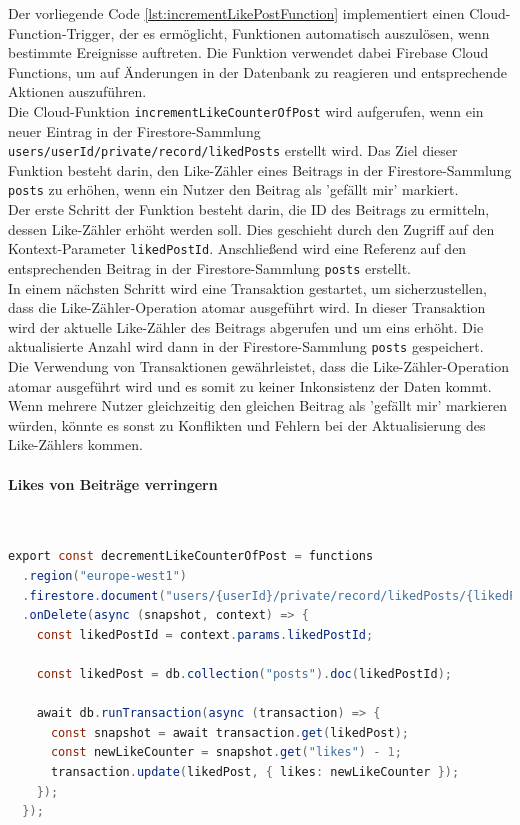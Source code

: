 Der vorliegende Code \ref{lst:incrementLikePostFunction} implementiert einen Cloud-Function-Trigger, der es ermöglicht, Funktionen automatisch auszulösen, wenn bestimmte Ereignisse auftreten. Die Funktion verwendet dabei Firebase Cloud Functions, um auf Änderungen in der Datenbank zu reagieren und entsprechende Aktionen auszuführen.
\\
Die Cloud-Funktion \texttt{incrementLikeCounterOfPost} wird aufgerufen, wenn ein neuer Eintrag in der Firestore-Sammlung \texttt{users/{userId}/private/record/likedPosts} erstellt wird. Das Ziel dieser Funktion besteht darin, den Like-Zähler eines Beitrags in der Firestore-Sammlung \texttt{posts} zu erhöhen, wenn ein Nutzer den Beitrag als 'gefällt mir' markiert.
\\
Der erste Schritt der Funktion besteht darin, die ID des Beitrags zu ermitteln, dessen Like-Zähler erhöht werden soll. Dies geschieht durch den Zugriff auf den Kontext-Parameter \texttt{likedPostId}. Anschließend wird eine Referenz auf den entsprechenden Beitrag in der Firestore-Sammlung \texttt{posts} erstellt.
\\
In einem nächsten Schritt wird eine Transaktion gestartet, um sicherzustellen, dass die Like-Zähler-Operation atomar ausgeführt wird. In dieser Transaktion wird der aktuelle Like-Zähler des Beitrags abgerufen und um eins erhöht. Die aktualisierte Anzahl wird dann in der Firestore-Sammlung \texttt{posts} gespeichert.
\\
Die Verwendung von Transaktionen gewährleistet, dass die Like-Zähler-Operation atomar ausgeführt wird und es somit zu keiner Inkonsistenz der Daten kommt. Wenn mehrere Nutzer gleichzeitig den gleichen Beitrag als 'gefällt mir' markieren würden, könnte es sonst zu Konflikten und Fehlern bei der Aktualisierung des Like-Zählers kommen.

\paragraph{Likes von Beiträge verringern}\mbox{} \\

\begin{lstlisting}[language=Java,caption=decrementLikeCounterOfPost Funktion,label=lst:decrementLikePostFunction]
  export const decrementLikeCounterOfPost = functions
  .region("europe-west1")
  .firestore.document("users/{userId}/private/record/likedPosts/{likedPostId}")
  .onDelete(async (snapshot, context) => {
    const likedPostId = context.params.likedPostId;

    const likedPost = db.collection("posts").doc(likedPostId);

    await db.runTransaction(async (transaction) => {
      const snapshot = await transaction.get(likedPost);
      const newLikeCounter = snapshot.get("likes") - 1;
      transaction.update(likedPost, { likes: newLikeCounter });
    });
  });
\end{lstlisting}

